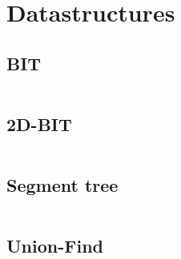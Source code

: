 \section{Datastructures}
\subsection{BIT}
\inputminted[frame=single,framesep=3pt,tabsize=2,breaklines=true,linenos,label=O(log(N))]{c++}{structures/bit.cpp}

\subsection{2D-BIT}
\inputminted[frame=single,framesep=3pt,tabsize=2,breaklines=true,linenos,label=O(N log(N))]{c++}{structures/bit-2d.cpp}

\subsection{Segment tree}
\inputminted[frame=single,framesep=3pt,breaklines=true,tabsize=2,linenos,label=O(log(N))]{c++}{structures/segment-tree.cpp}

\subsection{Union-Find}
\inputminted[frame=single,framesep=3pt,tabsize=2,breaklines=true,linenos,label=O($\alpha$)]{c++}{structures/union-find.cpp}